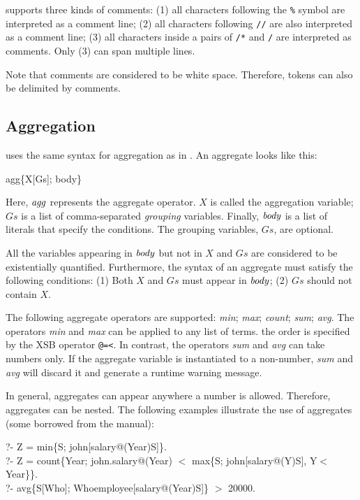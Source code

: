 \documentclass[11pt]{report}
\begin{document}
\FLORA supports three kinds of comments: (1) all characters following the
{\tt \%} symbol are interpreted as a comment line; (2) all characters
following {\tt //} are also interpreted as a comment line;
(3) all characters inside a pairs of {\tt /*} and {\tt */} are
interpreted as comments. Only (3) can span multiple lines.

Note that comments are considered to be white space. Therefore, tokens can
also be delimited by comments.


\subsection{Aggregation}

\FLORA uses the same syntax for aggregation as in \FLORID. An aggregate
looks like this:
\begin{qrules}
agg\{X[Gs]; body\}
\end{qrules}
Here, ${\it agg}$ represents the aggregate operator. $X$ is called the
aggregation variable; $Gs$ is a list of comma-separated \emph{grouping}
variables. Finally, ${\it body}$ is a list of literals that specify the
conditions. The grouping variables, $Gs$, are optional.

All the variables appearing in ${\it body}$ but not in $X$ and $Gs$ are
considered to be existentially quantified. Furthermore, the syntax of an
aggregate must satisfy the following conditions: (1) Both $X$ and $Gs$ must
appear in ${\it body}$; (2) $Gs$ should not contain $X$.

The following aggregate operators are supported: {\it min}; {\it max}; {\it
  count}; {\it sum}; {\it avg}. The operators {\it min} and {\it max} can
be applied to any list of terms. the order is specified by the XSB operator
{\tt @=<}.  In contrast, the operators {\it sum} and {\it avg} can take
numbers only. If the aggregate variable is instantiated to a non-number,
{\it sum} and {\it avg} will discard it and generate a runtime warning
message.

In general, aggregates can appear anywhere a number is allowed. Therefore,
aggregates can be nested. The following examples illustrate the use of
aggregates (some borrowed from the \FLORID manual):
\begin{qrules}
?- Z = min\{S; john[salary@(Year){\fd}S]\}. \\
?- Z = count\{Year; john.salary@(Year) $<$ max\{S; john[salary@(Y){\fd}S], Y$<$Year\}\}. \\
?- avg\{S[Who]; Who{\isa}employee[salary@(Year){\fd}S]\} $>$ 20000.
\end{qrules}
\end{document}
